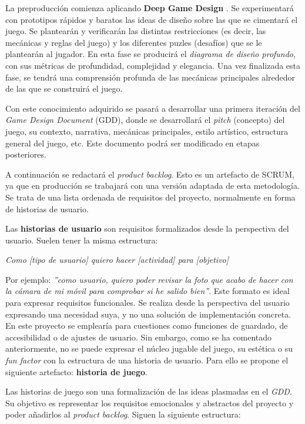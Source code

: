 La preproducción comienza aplicando \textbf{Deep Game Design} \cite{deepdesign}. Se experimentará con prototipos rápidos y baratos las ideas de diseño sobre las que se cimentará el juego. Se plantearán y verificarán las distintas restricciones (es decir, las mecánicas y reglas del juego) y los diferentes puzles (desafíos) que se le plantearán al jugador. En esta fase se producirá el \textit{diagrama de diseño profundo}, con sus métricas de profundidad, complejidad y elegancia. Una vez finalizada esta fase, se tendrá una comprensión profunda de las mecánicas principales alrededor de las que se construirá el juego.

Con este conocimiento adquirido se pasará a desarrollar una primera iteración del \textit{Game Design Document} (GDD), donde se desarrollará el \textit{pitch} (concepto) del juego, su contexto, narrativa, mecánicas principales, estilo artístico, estructura general del juego, etc. Este documento podrá ser modificado en etapas posteriores.

A continuación se redactará el \textit{product backlog}. Esto es un artefacto de SCRUM, ya que en producción se trabajará con una versión adaptada de esta metodología. Se trata de una lista ordenada de requisitos del proyecto, normalmente en forma de historias de usuario.

Las \textbf{historias de usuario} son requisitos formalizados desde la perspectiva del usuario. Suelen tener la misma estructura:\\ 


\centerline{\textit{Como [tipo de usuario] quiero hacer [actividad] para [objetivo]}}

Por ejemplo: \textit{''como usuario, quiero poder revisar la foto que acabo de hacer con la cámara de mi móvil para comprobar si he salido bien''}. Este formato es ideal para expresar requisitos funcionales. Se realiza desde la perspectiva del usuario expresando una necesidad suya, y no una solución de implementación concreta. En este proyecto se emplearía para cuestiones como funciones de guardado, de accesibilidad o de ajustes de usuario. Sin embargo, como se ha comentado anteriormente, no se puede expresar el núcleo jugable del juego, su estética o su \textit{fun factor} con la estructura de una historia de usuario. Para ello se propone el siguiente artefacto: \textbf{historia de juego}.

Las historias de juego son una formalización de las ideas plasmadas en el \textit{GDD}. Su objetivo es representar los requisitos emocionales y abstractos del proyecto y poder añadirlos al \textit{product backlog}. Siguen la siguiente estructura:\\

